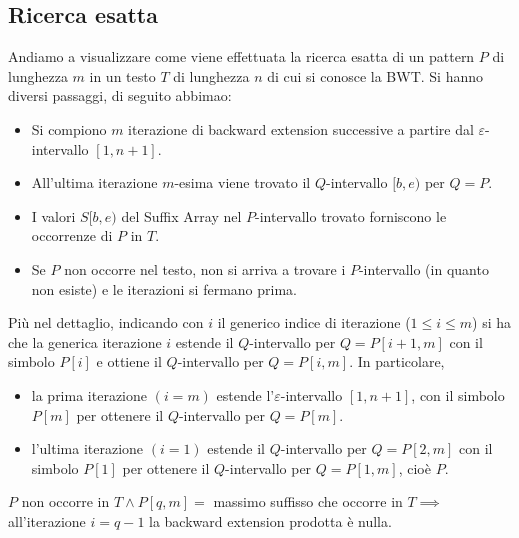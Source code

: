 \subsection{Ricerca esatta}
Andiamo a visualizzare come viene effettuata la ricerca esatta di un pattern $P$ di lunghezza $m$ in un testo $T$ di lunghezza $n$ di cui si conosce la BWT. Si hanno diversi passaggi, di seguito abbimao:
\begin{itemize}
    \item Si compiono $m$ iterazione di backward extension successive a partire dal $\varepsilon$-intervallo $[1, n+1]$.
    \item  All’ultima iterazione $m$-esima viene trovato il $Q$-intervallo $[b,e)$ per $Q=P$. 
    \item I valori $S[b,e)$ del Suffix Array nel $P$-intervallo trovato forniscono le occorrenze di $P$ in $T$.
    \item Se $P$ non occorre nel testo, non si arriva a trovare i $P$-intervallo (in quanto non esiste) e le iterazioni si fermano prima.
\end{itemize}
Più nel dettaglio, indicando con $i$ il generico indice di iterazione ($1 \leq i \leq m$) si ha che la generica iterazione $i$ estende il $Q$-intervallo per $Q=P[i+1, m]$ con il simbolo $P[i]$ e ottiene il $Q$-intervallo per $Q=P[i,m]$.
In particolare, 
\begin{itemize}
    \item la prima iterazione $(i=m)$ estende l’$\varepsilon$-intervallo $[1,n+1]$, con il simbolo $P[m]$ per ottenere il $Q$-intervallo per $Q=P[m]$.
    \item l’ultima iterazione $(i=1)$ estende il $Q$-intervallo per $Q=P[2,m]$ con il simbolo $P[1]$ per ottenere il $Q$-intervallo per $Q=P[1,m]$, cioè $P$.
\end{itemize}
$P$ non occorre in $T \land P[q,m] = $ massimo suffisso che occorre in $T \implies$ all’iterazione $i = q-1$ la backward extension prodotta è nulla.\\

